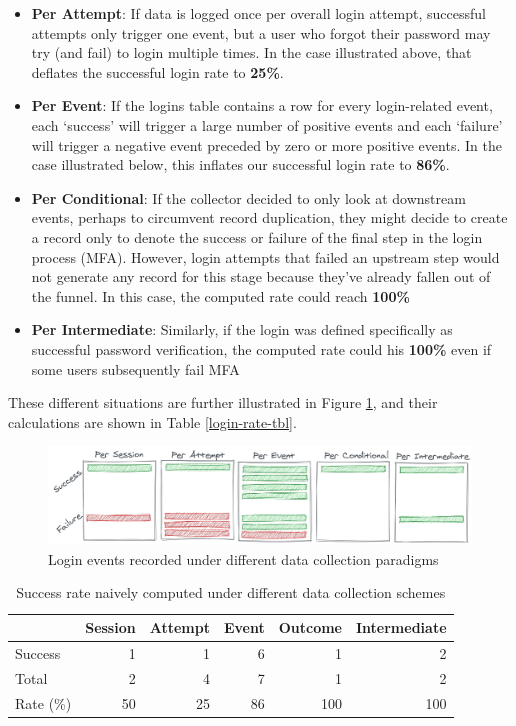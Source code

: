 \documentclass[
]{krantz}
\providecommand{\tightlist}{%
  \setlength{\itemsep}{0pt}\setlength{\parskip}{0pt}}
\begin{document}
\begin{itemize}
\tightlist
\item
  \textbf{Per Attempt}: If data is logged once per overall login attempt, successful attempts only trigger one event, but a user who forgot their password may try (and fail) to login multiple times. In the case illustrated above, that deflates the successful login rate to \textbf{25\%}.
\item
  \textbf{Per Event}: If the logins table contains a row for every login-related event, each `success' will trigger a large number of positive events and each `failure' will trigger a negative event preceded by zero or more positive events. In the case illustrated below, this inflates our successful login rate to \textbf{86\%}.
\item
  \textbf{Per Conditional}: If the collector decided to only look at downstream events, perhaps to circumvent record duplication, they might decide to create a record only to denote the success or failure of the final step in the login process (MFA). However, login attempts that failed an upstream step would not generate any record for this stage because they've already fallen out of the funnel. In this case, the computed rate could reach \textbf{100\%}
\item
  \textbf{Per Intermediate}: Similarly, if the login was defined specifically as successful password verification, the computed rate could his \textbf{100\%} even if some users subsequently fail MFA
\end{itemize}

These different situations are further illustrated in Figure \ref{fig:login-rate}, and their calculations are shown in Table \ref{login-rate-tbl}.

\begin{figure}

{\centering \includegraphics[width=0.9\linewidth]{figures/data-dall/login-rate} 

}

\caption{Login events recorded under different data collection paradigms}\label{fig:login-rate}
\end{figure}

\begin{table}

\caption{\label{tab:login-rate-tbl}Success rate naively computed under different data collection schemes}
\centering
\begin{tabular}[t]{l|r|r|r|r|r}
\hline
  & Session & Attempt & Event & Outcome & Intermediate\\
\hline
Success & 1 & 1 & 6 & 1 & 2\\
\hline
Total & 2 & 4 & 7 & 1 & 2\\
\hline
Rate (\%) & 50 & 25 & 86 & 100 & 100\\
\hline
\end{tabular}
\end{table}
\end{document}
